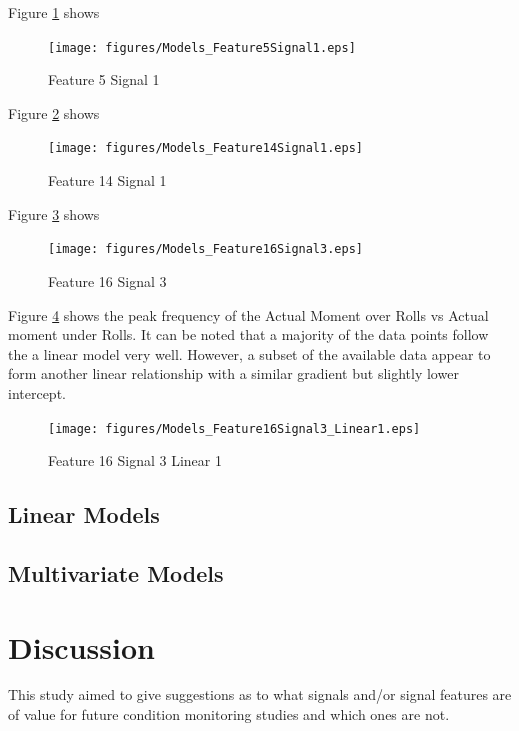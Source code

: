 \documentclass{article}
\begin{document}
Figure \ref{fig:Models_Feature5Signal1} shows 
\begin{figure}[H]
    \centering
    \texttt{[image: figures/Models\_Feature5Signal1.eps]}
    \caption{Feature 5 Signal 1}
    \label{fig:Models_Feature5Signal1}
\end{figure}


Figure \ref{fig:Models_Feature14Signal1} shows 
\begin{figure}[H]
    \centering
    \texttt{[image: figures/Models\_Feature14Signal1.eps]}
    \caption{Feature 14 Signal 1}
    \label{fig:Models_Feature14Signal1}
\end{figure}

Figure \ref{fig:Models_Feature16Signal3} shows 
\begin{figure}[H]
    \centering
    \texttt{[image: figures/Models\_Feature16Signal3.eps]}
    \caption{Feature 16 Signal 3}
    \label{fig:Models_Feature16Signal3}
\end{figure}

Figure \ref{fig:Models_Feature16Signal3_Linear1} shows the peak frequency of the Actual Moment over Rolls vs Actual moment under Rolls. It can be noted that a majority of the data points follow the a linear model very well. However, a subset of the available data appear to form another linear relationship with a similar gradient but slightly lower intercept.
\begin{figure}[H]
    \centering
    \texttt{[image: figures/Models\_Feature16Signal3\_Linear1.eps]}
    \caption{Feature 16 Signal 3 Linear 1}
    \label{fig:Models_Feature16Signal3_Linear1}
\end{figure}

\subsection{Linear Models}

\subsection{Multivariate Models}

\clearpage 

\section{Discussion}
This study aimed to give suggestions as to what signals and/or signal features are of value for future condition monitoring studies and which ones are not.
\end{document}
